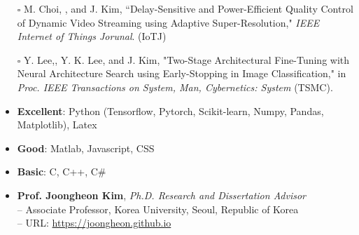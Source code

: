\documentclass[10pt,letterpaper]{article}
\begin{document}
{\begin{itemize}
\begin{itemize}
          \item[$\square$] M. Choi, , and J. Kim, ``Delay-Sensitive and Power-Efficient Quality Control of Dynamic Video Streaming using Adaptive Super-Resolution," \textit{IEEE Internet of Things Jorunal}. (IoTJ)
          \item[$\square$] Y. Lee,, Y. K. Lee, and J. Kim, "Two-Stage Architectural Fine-Tuning with Neural Architecture Search using Early-Stopping in Image Classification," in \textit{Proc. IEEE Transactions on System, Man, Cybernetics: System} (TSMC).
         \end{itemize}
         \end{itemize}
}


       



\spacedhrule{0.0em}{-0.8em}

\begin{itemize}\itemsep=-0.2mm
    \item \textbf{Excellent}: Python (Tensorflow, Pytorch, Scikit-learn, Numpy, Pandas, Matplotlib), Latex
    \item \textbf{Good}: Matlab,  Javascript, CSS
    \item \textbf{Basic}: C, C++, C\#
\end{itemize}
\spacedhrule{0.0em}{-0.8em}

\begin{itemize}\itemsep=-0.2mm
    \item \textbf{Prof. Joongheon Kim}, \textit{Ph.D. Research and Dissertation Advisor}
    \\ -- Associate Professor, Korea University, Seoul, Republic of Korea
    \\ -- URL: \url{https://joongheon.github.io}
\end{itemize}
\end{document}
